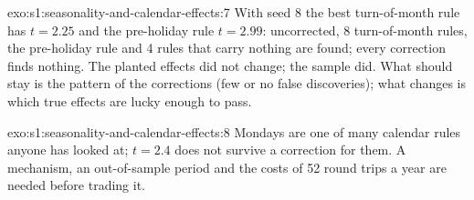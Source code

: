 \begin{solution}{exo:s1:seasonality-and-calendar-effects:7}
With seed 8 the best turn-of-month rule has $t = 2.25$ and the pre-holiday rule $t = 2.99$: uncorrected, 8 turn-of-month rules, the pre-holiday rule
and 4 rules that carry nothing are found; every correction finds nothing. The planted effects did not change; the sample did. What should stay is the
pattern of the corrections (few or no false discoveries); what changes is which true effects are lucky enough to pass.
\end{solution}

\begin{solution}{exo:s1:seasonality-and-calendar-effects:8}
Mondays are one of many calendar rules anyone has looked at; $t = 2.4$ does not survive a correction for them. A mechanism, an out-of-sample period and
the costs of 52 round trips a year are needed before trading it.
\end{solution}


